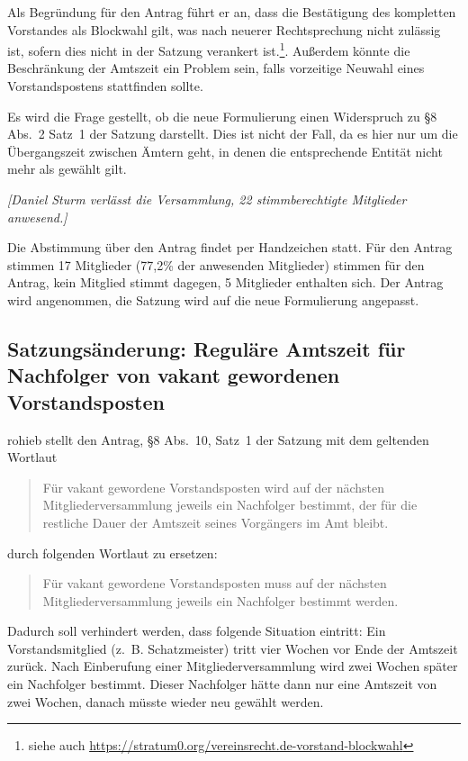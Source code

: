 \documentclass[a4paper,12pt]{scrartcl}
\begin{document}
Als Begründung für den Antrag führt er an, dass die Bestätigung des kompletten
Vorstandes als Blockwahl gilt, was nach neuerer Rechtsprechung nicht zulässig
ist, sofern dies nicht in der Satzung verankert ist.\footnote{siehe auch 
\url{https://stratum0.org/vereinsrecht.de-vorstand-blockwahl}}.
Außerdem könnte die Beschränkung der Amtszeit ein Problem sein, falls vorzeitige
Neuwahl eines Vorstandspostens stattfinden sollte.

Es wird die Frage gestellt, ob die neue Formulierung einen Widerspruch zu §8
Abs.~2 Satz~1 der Satzung darstellt. Dies ist nicht der Fall, da es hier nur um
die Übergangszeit zwischen Ämtern geht, in denen die entsprechende Entität nicht
mehr als gewählt gilt.

\emph{[Daniel Sturm verlässt die Versammlung, 22 stimmberechtigte Mitglieder
anwesend.]}

Die Abstimmung über den Antrag findet per Handzeichen statt. Für den Antrag
stimmen 17 Mitglieder (77{,}2\% der anwesenden Mitglieder) stimmen für den
Antrag, kein Mitglied stimmt dagegen, 5 Mitglieder enthalten sich. Der
Antrag wird angenommen, die Satzung wird auf die neue Formulierung angepasst.

\subsection{Satzungsänderung: Reguläre Amtszeit für Nachfolger von vakant
gewordenen Vorstandsposten}

rohieb stellt den Antrag, §8 Abs.~10, Satz~1 der Satzung mit dem geltenden
Wortlaut
\begin{quote}
  Für vakant gewordene Vorstandsposten wird auf der nächsten
  Mitgliederversammlung jeweils ein Nachfolger bestimmt, der für die restliche
  Dauer der Amtszeit seines Vorgängers im Amt bleibt.
\end{quote}
durch folgenden Wortlaut zu ersetzen:
\begin{quote}
  Für vakant gewordene Vorstandsposten muss auf der nächsten
  Mitgliederversammlung jeweils ein Nachfolger bestimmt werden.
\end{quote}

Dadurch soll verhindert werden, dass folgende Situation eintritt: Ein
Vorstandsmitglied (z.~B. Schatzmeister) tritt vier Wochen vor Ende der Amtszeit
zurück. Nach Einberufung einer Mitgliederversammlung wird zwei Wochen später ein
Nachfolger bestimmt. Dieser Nachfolger hätte dann nur eine Amtszeit von zwei
Wochen, danach müsste wieder neu gewählt werden.
\end{document}
